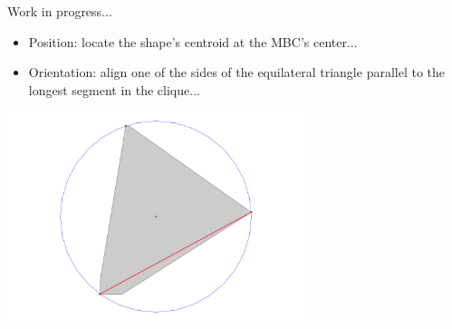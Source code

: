 \documentclass{beamer}
\begin{document}
\begin{frame}{Work in progress...}
    \begin{itemize}
     \item Position: locate the shape's centroid at the MBC's center...
     \item Orientation: align one of the sides of the equilateral triangle parallel to the longest segment in the clique...
    \end{itemize}

    \centering
    \includegraphics[width=0.65\textwidth]{figures/output2_90}
\end{frame}
\end{document}
